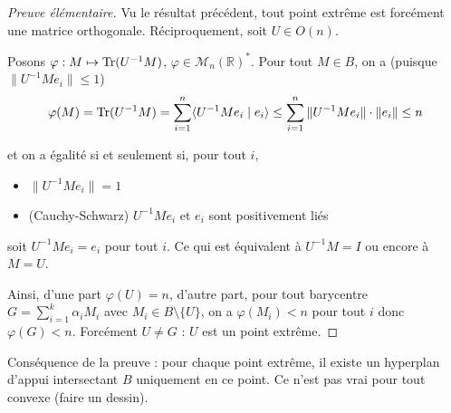 \documentclass[a4paper, 11pt]{article}
\def\R{\mathbb{R}}
\def\M{\mathcal{M}}
\def\Tr{\textnormal{Tr}}
\newtheorem*{theorem}{Théorème}
\newtheorem*{corollary}{Corollaire}
\begin{document}
\begin{proof}[Preuve élémentaire] Vu le résultat précédent, tout point extrême
  est forcément une matrice orthogonale. Réciproquement, soit $U \in O(n)$.

Posons $\varphi : M \mapsto \Tr(U^{-1}M)$, $\varphi \in \M_n(\R)^*$. Pour
tout $M \in B$, on a (puisque $\| U^{-1}M e_i \| \leq 1$)
\[ \varphi(M) = \Tr(U^{-1}M) = \sum_{i=1}^n \langle U^{-1}M e_i \mid e_i \rangle
  \leq \sum_{i=1}^n \| U^{-1}M e_i \| \cdot \| e_i \| \leq n \]

et on a égalité si et seulement si, pour tout $i$,
\begin{itemize}
\item $\| U^{-1}M e_i \| = 1$
\item (Cauchy-Schwarz) $U^{-1}M e_i$ et $e_i$ sont positivement liés
\end{itemize}
soit $U^{-1}M e_i = e_i$ pour tout $i$. Ce qui est équivalent à $U^{-1}M = I$ ou
encore à $M = U$.

Ainsi, d'une part $\varphi(U) = n$, d'autre part, pour tout barycentre $G =
\sum_{i=1}^k \alpha_i M_i$ avec $M_i \in B \setminus \{U\}$, on a $\varphi(M_i) <
n$ pour tout $i$ donc $\varphi(G) < n$. Forcément $U \neq G$ : $U$ est un point
extrême.
\end{proof}

Conséquence de la preuve : pour chaque point extrême, il existe un hyperplan
d'appui intersectant $B$ uniquement en ce point. Ce n'est pas vrai pour tout
convexe (faire un dessin).


\end{document}
